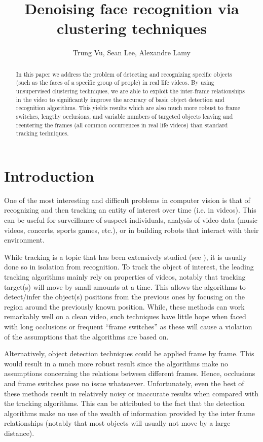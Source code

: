 \documentclass{article}
\title{Denoising face recognition via clustering techniques}
\author{Trung Vu, Sean Lee, Alexandre Lamy%
}
\begin{document}

\maketitle

\begin{abstract}
  In this paper we address the problem of detecting and recognizing specific objects (such as the faces of a specific group of people)
  in real life videos. By using unsupervised clustering techniques, we are able to exploit the inter-frame relationships in the 
  video to significantly improve the accuracy of basic object detection and recognition algorithms. This yields results which are
  also much more robust to frame switches, lengthy occlusions, and variable numbers of targeted objects leaving and reentering the frames 
  (all common occurrences in real life videos) than standard tracking techniques.
\end{abstract}

\section{Introduction}



One of the most interesting and difficult problems in computer vision is that of recognizing and then tracking an
entity of interest over time (i.e. in videos). This can be useful for surveillance of suspect individuals,
analysis of video data (music videos, concerts, sports games, etc.), or in building robots that interact with their 
environment. 

While tracking is a topic that has been extensively studied (see \cite{benchmarksurvey}), it is usually
done so in isolation from recognition. To track the object of interest, the leading tracking algorithms mainly rely on 
properties of videos, notably that tracking target(s)
will move by small amounts at a time. This allows the algorithms to detect/infer the object(s) positions from the previous ones by
focusing on the region around the previously known position. While, these methods can work remarkably well on a clean video, such techniques have 
little hope when faced with long occlusions or frequent ``frame switches'' as these will cause a violation of the assumptions that the algorithms are based on.

Alternatively, object detection techniques could be applied frame by frame. This would result in a much more robust result since the algorithms
make no assumptions concerning the relations between different frames. Hence, occlusions and frame switches pose no issue whatsoever. Unfortunately, even 
the best of these methods result in relatively noisy or inaccurate results when compared with the tracking algorithms. This can be attributed to the fact that the detection
algorithms make no use of the wealth of information provided by the inter frame relationships (notably that most objects will usually not move by a large distance).
\end{document}
